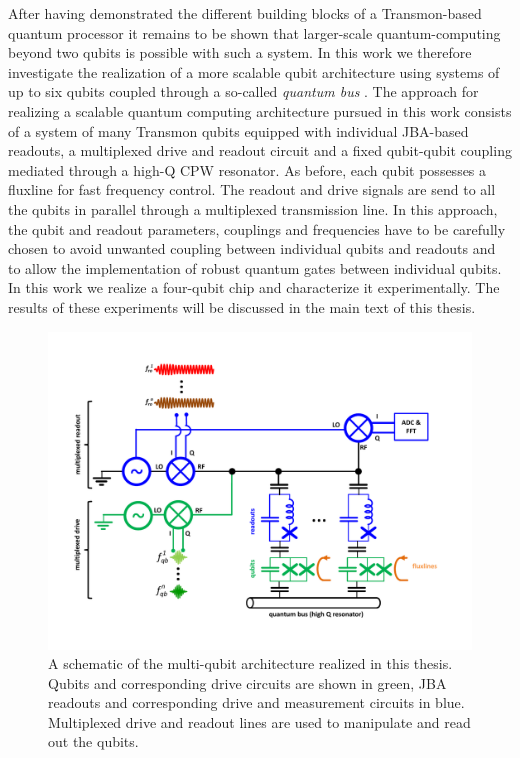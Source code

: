 After having demonstrated the different building blocks of a Transmon-based quantum processor it remains to be shown that larger-scale quantum-computing beyond two qubits is possible with such a system. In this work we therefore investigate the realization of a more scalable qubit architecture using systems of up to six qubits coupled through a so-called {\it quantum bus} \citep{majer_coupling_2007}. The approach for realizing a scalable quantum computing architecture pursued in this work consists of a system of many Transmon qubits equipped with individual JBA-based readouts, a multiplexed drive and readout circuit and a fixed qubit-qubit coupling mediated through a high-Q CPW resonator. As before, each qubit possesses a fluxline for fast frequency control. The readout and drive signals are send to all the qubits in parallel through a multiplexed transmission line. In this approach, the qubit and readout parameters, couplings and frequencies have to be carefully chosen to avoid unwanted coupling between individual qubits and readouts and to allow the implementation of robust quantum gates between individual qubits. In this work we realize a four-qubit chip and characterize it experimentally. The results of these experiments will be discussed in the main text of this thesis.

\begin{figure}[ht!]
  \centering
	\includegraphics[width=1.\textwidth]{"./material/figures/scalable-architecture/scalable architecture - schematic"}
	\caption[Schematic of the multi-qubit architecture realized in this thesis]{A schematic of the multi-qubit architecture realized in this thesis. Qubits and corresponding drive circuits are shown in green, JBA readouts and corresponding drive and measurement circuits in blue. Multiplexed drive and readout lines are used to manipulate and read out the qubits.}
\end{figure}
